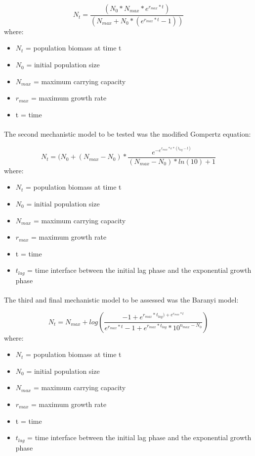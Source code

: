 \documentclass[11pt, a4paper]{article} %
\begin{document}
\begin{equation}
N_t = \frac{(N_0 * N_{max} * e^{r_{max} * t})} {(N_{max} + N_0 * (e^{r_{max} * t} - 1))}
\label{eqn:logistic}
\end{equation}
where:
\begin{itemize}
\item $N_t$ = population biomass at time t
\item $N_0$ = initial population size
\item $N_{max}$ = maximum carrying capacity
\item $r_{max}$ = maximum growth rate
\item t = time
\end{itemize}

\paragraph{} The second mechanistic model to be tested was the modified Gompertz equation: 

\begin{equation}
N_t = (N_0 + (N_{max} - N_0) * \frac{e^{-e^{r_{max} * e * (t_{lag} - t)}}} {(N_{max} - N_0) * ln(10) + 1}
\label{eqn:Gompertz}
\end{equation}
where:
\begin{itemize}
\item $N_t$ = population biomass at time t
\item $N_0$ = initial population size
\item $N_{max}$ = maximum carrying capacity
\item $r_{max}$ = maximum growth rate 
\item t = time
\item $t_{lag}$ = time interface between the initial lag phase and the exponential growth phase
\end{itemize}

\paragraph{} The third and final mechanistic model to be assessed was the Baranyi model:

\begin{equation}
N_t = N_{max} + log(\frac{-1 + e^{r_{max} * t_{lag}) + e^{r_{max} * t}}}{e^{r_{max} * t} - 1 + e^{r_{max} * t_{lag}} * 10^{n_{max} - N_0}})
\label{eqn:Baranyi}
\end{equation}
where:
\begin{itemize}
\item $N_t$ = population biomass at time t
\item $N_0$ = initial population size
\item $N_{max}$ = maximum carrying capacity
\item $r_{max}$ = maximum growth rate
\item t = time
\item $t_{lag}$ = time interface between the initial lag phase and the exponential growth phase
\end{itemize}
\end{document}
